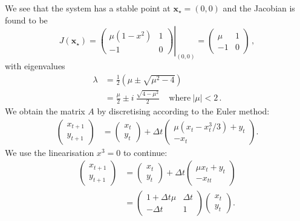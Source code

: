 We see that the system has a stable point at $\mathbf{x}_\star=(0,0)$ and the Jacobian is found to be
	\begin{equation}
		J(\mathbf{x}_\star) = \left.\left(
		\begin{array}{cc}
		\mu(1-x^2) & 1\\
		-1 & 0
		\end{array}
		\right)\right|_{(0,0)} = \left(
		\begin{array}{cc}
		\mu & 1\\
		-1 & 0
		\end{array}
		\right) \,,
	\label{eqn:2D:exampleVDPJacobian}
	\end{equation}
with eigenvalues
	\begin{align}
		\lambda &=\frac{1}{2}\left(\mu\pm\sqrt{\mu^2-4}\right)\\
		&= \frac{\mu}{2}\pm i~ \frac{\sqrt{4-\mu^2}}{2}~~~~~ \text{where}~|\mu|<2\,.
	\label{eqn:2D:VDPactualJacobianEigenvalues}
	\end{align} 
We obtain the matrix $A$ by discretising according to the Euler method:
	\begin{align}
		\left(\begin{array}{c}
		x_{t+1}\\y_{t+1}
		\end{array}\right) &= \left(\begin{array}{c}
		x_{t}\\y_{t}\end{array}\right) + \Delta t \left(\begin{array}{c}
		\mu(x_{t}-x_{t}^3/3)+y_{t}\\
		-x_{t}
		\end{array}\right).
	\end{align}
We use the linearisation $x^3=0$ to continue:
	\begin{align}
		\left(\begin{array}{c}
		x_{t+1}\\y_{t+1}
		\end{array}\right) &= \left(\begin{array}{c}
		x_{t}\\y_{t}\end{array}\right) + \Delta t \left(\begin{array}{c}
		\mu x_{t} +y_{t}\\
		-x_{tt}
		\end{array}\right)\\
		&= \left(\begin{array}{cc}
		1 + \Delta t \mu & \Delta t\\
		-\Delta t & 1
		\end{array}\right) \left(\begin{array}{c}
		x_{t}\\y_{t}\end{array}\right).
	\label{eqn:2D:AnalyticMatrixA}
	\end{align}
